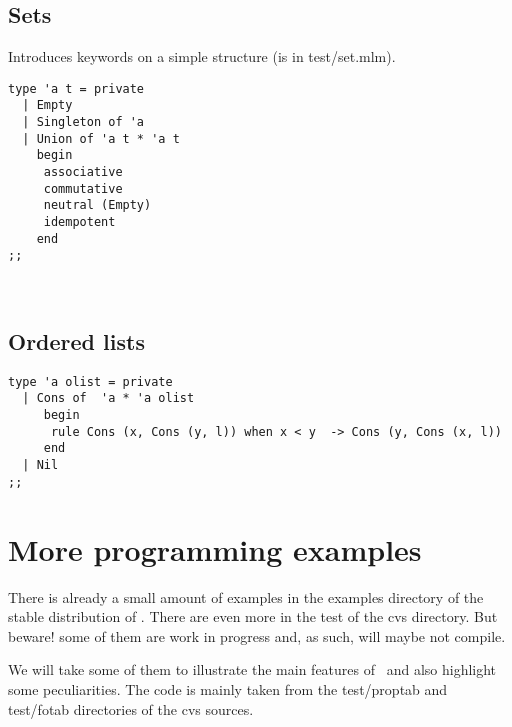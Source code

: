 \documentclass{article}
\begin{document}
\subsection{Sets}

Introduces keywords on a simple structure (is in {\sf test/set.mlm}).

\begin{lstlisting}[float, caption={Sets in \moca}, captionpos=b]
type 'a t = private
  | Empty
  | Singleton of 'a
  | Union of 'a t * 'a t
    begin
     associative
     commutative
     neutral (Empty)
     idempotent
    end
;;
\end{lstlisting}

 \\

\subsection{Ordered lists}
\label{sec:olist}

\begin{lstlisting}[caption={Ordered lists}]
  type 'a olist = private
  | Cons of  'a * 'a olist
     begin
      rule Cons (x, Cons (y, l)) when x < y  -> Cons (y, Cons (x, l))
     end
  | Nil
;;
\end{lstlisting}

\section{More programming examples}
\label{sec:mpex}

There is already a small amount of examples in the {\sf examples}
directory of the stable distribution of \moca. There are even more in
the {\sf test} of the cvs directory. But beware! some of them are work
in progress and, as such, will maybe not compile.

\par We will take some of them to illustrate the main features of
\moca\ and also highlight some peculiarities. The code is mainly taken
from the {\sf test/proptab} and {\sf test/fotab} directories of the
cvs sources.
\end{document}
